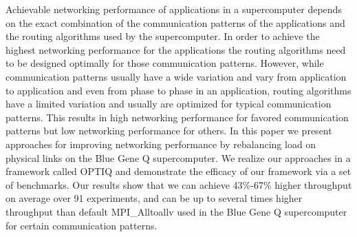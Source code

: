 Achievable networking performance of applications in a supercomputer depends on the exact combination of the communication patterns of the applications and the routing algorithms used by the supercomputer. In order to achieve the highest networking performance for the applications the routing algorithms need to be designed optimally for those communication patterns. However, while communication patterns usually have a wide variation and vary from application to application and even from phase to phase in an application, routing algorithms have a limited variation and usually are optimized for typical communication patterns. This results in high networking performance for favored communication patterns but low networking performance for others. In this paper we present approaches for improving networking performance by rebalancing load on physical links on the Blue Gene Q supercomputer. We realize our approaches in a framework called OPTIQ and demonstrate the efficacy of our framework via a set of benchmarks. Our results show that we can achieve 43\%-67\% higher throughput on average over 91 experiments, and can be up to several times higher throughput than default MPI\_Alltoallv used in the Blue Gene Q supercomputer for certain communication patterns.
